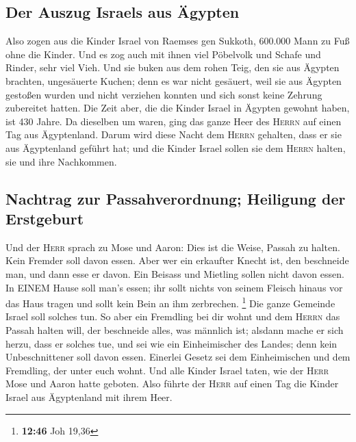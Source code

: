 \hypertarget{der-auszug-israels-aus-uxe4gypten}{%
\subsection{Der Auszug Israels aus
Ägypten}\label{der-auszug-israels-aus-uxe4gypten}}

 Also zogen aus die Kinder Israel von Raemses gen
Sukkoth, 600.000 Mann zu Fuß ohne die Kinder.  Und es zog
auch mit ihnen viel Pöbelvolk und Schafe und Rinder, sehr viel Vieh.
 Und sie buken aus dem rohen Teig, den sie aus Ägypten
brachten, ungesäuerte Kuchen; denn es war nicht gesäuert, weil sie aus
Ägypten gestoßen wurden und nicht verziehen konnten und sich sonst keine
Zehrung zubereitet hatten.  Die Zeit aber, die die Kinder
Israel in Ägypten gewohnt haben, ist 430 Jahre.  Da
dieselben um waren, ging das ganze Heer des \textsc{Herrn} auf einen Tag
aus Ägyptenland.  Darum wird diese Nacht dem
\textsc{Herrn} gehalten, dass er sie aus Ägyptenland geführt hat; und
die Kinder Israel sollen sie dem \textsc{Herrn} halten, sie und ihre
Nachkommen.

\hypertarget{nachtrag-zur-passahverordnung-heiligung-der-erstgeburt}{%
\subsection{Nachtrag zur Passahverordnung; Heiligung der
Erstgeburt}\label{nachtrag-zur-passahverordnung-heiligung-der-erstgeburt}}

 Und der \textsc{Herr} sprach zu Mose und Aaron: Dies ist
die Weise, Passah zu halten. Kein Fremder soll davon essen.
 Aber wer ein erkaufter Knecht ist, den beschneide man,
und dann esse er davon.  Ein Beisass und Mietling sollen
nicht davon essen.  In EINEM Hause soll man's essen; ihr
sollt nichts von seinem Fleisch hinaus vor das Haus tragen und sollt
kein Bein an ihm zerbrechen. \footnote{\textbf{12:46} Joh 19,36}
 Die ganze Gemeinde Israel soll solches tun.
 So aber ein Fremdling bei dir wohnt und dem
\textsc{Herrn} das Passah halten will, der beschneide alles, was
männlich ist; alsdann mache er sich herzu, dass er solches tue, und sei
wie ein Einheimischer des Landes; denn kein Unbeschnittener soll davon
essen.  Einerlei Gesetz sei dem Einheimischen und dem
Fremdling, der unter euch wohnt.  Und alle Kinder Israel
taten, wie der \textsc{Herr} Mose und Aaron hatte geboten.
 Also führte der \textsc{Herr} auf einen Tag die Kinder
Israel aus Ägyptenland mit ihrem Heer.

